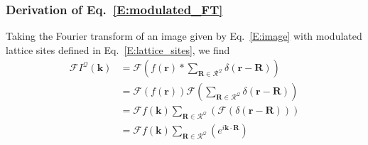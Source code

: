 \documentclass[12pt]{article}
\begin{document}
\subsubsection*{Derivation of Eq.~\ref{E:modulated_FT}}

Taking the Fourier transform of an image given by Eq.~\ref{E:image} with modulated lattice sites defined in Eq.~\ref{E:lattice_sites}, we find
\begin{align*}
    \mathcal{F}I^{\mathcal{Q}}(\mathbf{k}) &= \mathcal{F}\left(f(\mathbf{r})\ast\sum_{\mathbf{R}\in\mathcal{R}^{\mathcal{Q}}}\delta\left(\mathbf{r}-\mathbf{R}\right)\right) \\
        &=\mathcal{F}\left(f(\mathbf{r})\right)\mathcal{F}\left(\sum_{\mathbf{R}\in\mathcal{R}^{\mathcal{Q}}}\delta\left(\mathbf{r}-\mathbf{R}\right)\right) \\
        &=\mathcal{F}f(\mathbf{k})\sum_{\mathbf{R}\in\mathcal{R}^{\mathcal{Q}}}\left(\mathcal{F}\left(\delta\left(\mathbf{r}-\mathbf{R}\right)\right)\right) \\
        &=\mathcal{F}f(\mathbf{k})\sum_{\mathbf{R}\in\mathcal{R}^{\mathcal{Q}}}\left( e^{i\mathbf{k}\cdot\mathbf{R}} \right)
\end{align*}
\end{document}
